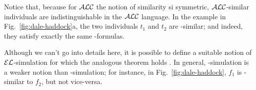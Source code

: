 {Notice that, because for $\mathcal{ALC}$ the notion of similarity si symmetric, $\mathcal{ALC}$-similar individuals are indistinguishable in the $\mathcal{ALC}$ language.  In the example in Fig.~\ref{fig:dale-haddock}a,
the two individuals $t_1$ and $t_2$ are \alc-similar; and indeed,
they satisfy exactly the same \alc-formulas.

Although we can't go
into details here, it is possible to define a suitable notion of
$\mathcal{EL}$-simulation for which the analogous theorem holds
\cite{kurt:expr99}.  In general, \el-simulation is a weaker notion
than \alc-simulation; for instance, in Fig.~\ref{fig:dale-haddock},
$f_1$ is \el-similar to $f_2$, but not vice-versa.

}





